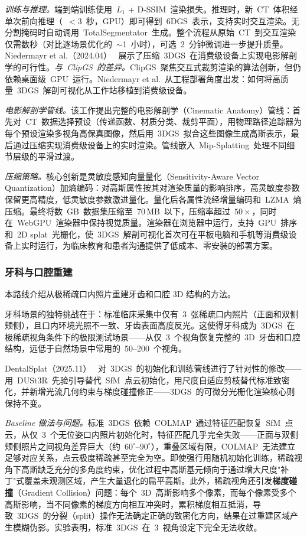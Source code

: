 \textit{训练与推理。}端到端训练使用~$L_1$ + D-SSIM~渲染损失。推理时，新~CT~体积经单次前向推理（~$<3$~秒，GPU）即可得到~6DGS~表示，支持实时交互渲染。无分割掩码时自动调用~TotalSegmentator~生成。整个流程从原始~CT~到交互渲染仅需数秒（对比逐场景优化的~$\sim$1~小时），可选~2~分钟微调进一步提升质量。Niedermayr et al.（2024.04）~\cite{2404_11285} 展示了压缩~3DGS~在消费级设备上实现电影解剖学的可行性。\textit{与~ClipGS~的差异。}ClipGS~聚焦交互式裁剪渲染的算法创新，但仍依赖桌面级~GPU~运行。Niedermayr et al.~从工程部署角度出发：如何将高质量~3DGS~解剖可视化从工作站移植到消费级设备。

\textit{电影解剖学管线。}该工作提出完整的电影解剖学（Cinematic Anatomy）管线：首先对~CT~数据选择预设（传递函数、材质分类、裁剪平面），用物理路径追踪器为每个预设渲染多视角高保真图像，然后用~3DGS~拟合这些图像生成高斯表示，最后通过压缩实现消费级设备上的实时渲染。管线嵌入~Mip-Splatting~处理不同细节层级的平滑过渡。

\textit{压缩策略。}核心创新是灵敏度感知向量量化（Sensitivity-Aware Vector Quantization）加熵编码：对高斯属性按其对渲染质量的影响排序，高灵敏度参数保留更高精度，低灵敏度参数激进量化。量化后各属性流经增量编码和~LZMA~熵压缩。最终将数~GB~数据集压缩至~70\,MB~以下，压缩率超过~$50\times$，同时在~WebGPU~渲染器中保持视觉质量。渲染器在浏览器中运行，支持~GPU~排序和~2D splat~光栅化，使~3DGS~解剖可视化首次可在平板电脑和手机等消费级设备上实时运行，为临床教育和患者沟通提供了低成本、零安装的部署方案。

\subsubsection{牙科与口腔重建}

本路线介绍从极稀疏口内照片重建牙齿和口腔 3D 结构的方法。

牙科场景的独特挑战在于：标准临床采集中仅有~3~张稀疏口内照片（正面和双侧颊侧），且口内环境光照不一致、牙齿表面高度反光。这使得牙科成为~3DGS~在极稀疏视角条件下的极限测试场景——从仅~3~个视角恢复完整的~3D~牙齿和口腔结构，远低于自然场景中常用的~50--200~个视角。

DentalSplat（2025.11）~\cite{2511_03099} 对~3DGS~的初始化和训练管线进行了针对性的修改——用~DUSt3R~先验引导替代~SfM~点云初始化，用尺度自适应剪枝替代标准致密化，并新增光流几何约束与梯度碰撞修正——3DGS~的可微分光栅化渲染核心则保持不变。

\textit{Baseline 做法与问题。}标准~3DGS~依赖~COLMAP~通过特征匹配恢复~SfM~点云，从仅~3~个无位姿口内照片初始化时，特征匹配几乎完全失败——正面与双侧颊侧照片之间视角差异巨大（约~$60^\circ$--$90^\circ$），重叠区域有限，COLMAP~无法建立足够对应关系，点云极度稀疏甚至完全为空。即使强行用随机初始化训练，稀疏视角下高斯缺乏充分的多角度约束，优化过程中高斯基元倾向于通过增大尺度"补丁"式覆盖未观测区域，产生大量退化的扁平高斯。此外，稀疏视角还引发\textbf{梯度碰撞}（Gradient Collision）问题：每个~3D~高斯影响多个像素，而每个像素受多个高斯影响，当不同像素的梯度方向相互冲突时，累积梯度相互抵消，导致~3DGS~的分裂（split）操作无法确定正确的致密化方向，结果在过重建区域产生模糊伪影。实验表明，标准~3DGS~在~3~视角设定下完全无法收敛。

